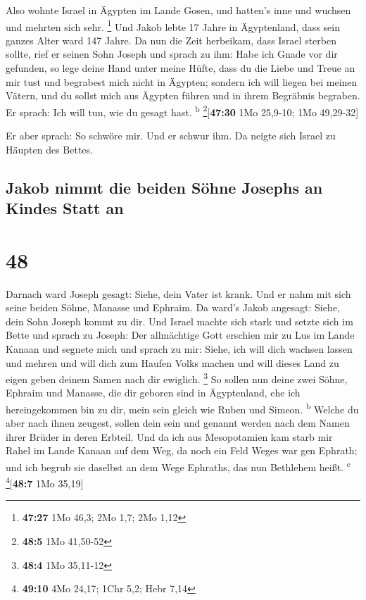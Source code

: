  Also wohnte Israel in Ägypten im Lande Gosen, und
hatten's inne und wuchsen und mehrten sich sehr. \footnote{\textbf{47:27}
  1Mo 46,3; 2Mo 1,7; 2Mo 1,12}  Und Jakob lebte 17 Jahre
in Ägyptenland, dass sein ganzes Alter ward 147 Jahre. 
Da nun die Zeit herbeikam, dass Israel sterben sollte, rief er seinen
Sohn Joseph und sprach zu ihm: Habe ich Gnade vor dir gefunden, so lege
deine Hand unter meine Hüfte, dass du die Liebe und Treue an mir tust
und begrabest mich nicht in Ägypten;  sondern ich will
liegen bei meinen Vätern, und du sollst mich aus Ägypten führen und in
ihrem Begräbnis begraben. Er sprach: Ich will tun, wie du gesagt hast.
\textsuperscript{b} \footnote{\textbf{48:5} 1Mo 41,50-52}{[}\textbf{47:30}
1Mo 25,9-10; 1Mo 49,29-32{]}

 Er aber sprach: So schwöre mir. Und er schwur ihm. Da
neigte sich Israel zu Häupten des Bettes.

\hypertarget{jakob-nimmt-die-beiden-suxf6hne-josephs-an-kindes-statt-an}{%
\subsection{Jakob nimmt die beiden Söhne Josephs an Kindes Statt
an}\label{jakob-nimmt-die-beiden-suxf6hne-josephs-an-kindes-statt-an}}

\hypertarget{section-47}{%
\section{48}\label{section-47}}

 Darnach ward Joseph gesagt: Siehe, dein Vater ist krank.
Und er nahm mit sich seine beiden Söhne, Manasse und Ephraim.
 Da ward's Jakob angesagt: Siehe, dein Sohn Joseph kommt
zu dir. Und Israel machte sich stark und setzte sich im Bette
 und sprach zu Joseph: Der allmächtige Gott erschien mir
zu Lus im Lande Kanaan und segnete mich  und sprach zu
mir: Siehe, ich will dich wachsen lassen und mehren und will dich zum
Haufen Volks machen und will dieses Land zu eigen geben deinem Samen
nach dir ewiglich. \footnote{\textbf{48:4} 1Mo 35,11-12} 
So sollen nun deine zwei Söhne, Ephraim und Manasse, die dir geboren
sind in Ägyptenland, ehe ich hereingekommen bin zu dir, mein sein gleich
wie Ruben und Simeon. \textsuperscript{b}  Welche du aber
nach ihnen zeugest, sollen dein sein und genannt werden nach dem Namen
ihrer Brüder in deren Erbteil.  Und da ich aus
Mesopotamien kam starb mir Rahel im Lande Kanaan auf dem Weg, da noch
ein Feld Weges war gen Ephrath; und ich begrub sie daselbst an dem Wege
Ephraths, das nun Bethlehem heißt. \textsuperscript{c}
\footnote{\textbf{49:10} 4Mo 24,17; 1Chr 5,2; Hebr 7,14}{[}\textbf{48:7}
1Mo 35,19{]}

